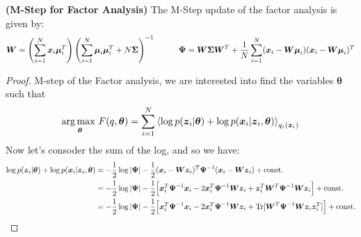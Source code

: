 \begin{proposition}{\textbf{(M-Step for Factor Analysis)}}
    The M-Step update of the factor analysis is given by:
    \begin{equation*}
    \begin{aligned}
        &\boldsymbol W = \left( \sum_{i=1}^N \boldsymbol x_i\boldsymbol \mu_i^T \right)\left( \sum_{i=1}^N \boldsymbol \mu_i\boldsymbol \mu_i^T + N\boldsymbol \Sigma \right)^{-1} \qquad
        &\boldsymbol \Psi = \boldsymbol W\boldsymbol \Sigma\boldsymbol W^T  + \frac{1}{N}\sum^N_{i=1} (\boldsymbol x_i - \boldsymbol W\boldsymbol \mu_i)(\boldsymbol x_i - \boldsymbol W\boldsymbol \mu_i)^T
    \end{aligned}
    \end{equation*}
\end{proposition}
\begin{proof}
    M-step of the Factor analysis, we are interested into find the variables $\boldsymbol \theta$ such that
    \begin{equation*}
        \underset{\boldsymbol \theta}{\arg\max \ } F(q, \boldsymbol \theta) = \sum_{i=1}^N\left\langle \log p(\boldsymbol z_i | \boldsymbol \theta) + \log p(\boldsymbol x_i | \boldsymbol z_i, \boldsymbol \theta) \right\rangle_{q_i(\boldsymbol z_i)}
    \end{equation*}
    Now let's consoder the sum of the log, and so we have:
    \begin{equation*}
    \begin{aligned}
        \log p(\boldsymbol z_i | \boldsymbol \theta) + \log p(\boldsymbol x_i | \boldsymbol z_i, \boldsymbol \theta) &= -\frac{1}{2}\log\abs{\boldsymbol \Psi} - \frac{1}{2}(\boldsymbol x_i - \boldsymbol W\boldsymbol z_i)^T\boldsymbol \Psi^{-1}(\boldsymbol x_i - \boldsymbol W\boldsymbol z_i) + \const \\
        &= -\frac{1}{2}\log\abs{\boldsymbol \Psi} - \frac{1}{2}\Big[ \boldsymbol x_i^T\boldsymbol \Psi^{-1}\boldsymbol x_i - 2\boldsymbol x_i^T\boldsymbol \Psi^{-1}\boldsymbol W\boldsymbol z_i + \boldsymbol z_i^T\boldsymbol W^T\boldsymbol \Psi^{-1}\boldsymbol W\boldsymbol z_i \Big] + \const \\
        &= -\frac{1}{2}\log\abs{\boldsymbol \Psi} - \frac{1}{2}\Big[ \boldsymbol x_i^T\boldsymbol \Psi^{-1}\boldsymbol x_i - 2\boldsymbol x_i^T\boldsymbol \Psi^{-1}\boldsymbol W\boldsymbol z_i + \operatorname{Tr}[\boldsymbol W^T\boldsymbol \Psi^{-1}\boldsymbol W\boldsymbol z_i\boldsymbol z_i^T] \Big] + \const \\
    \end{aligned}

\end{equation*}
\end{proof}
